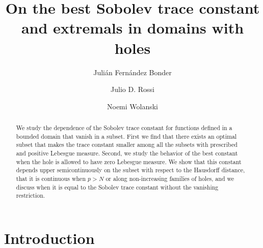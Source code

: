 \documentclass[11pt]{amsart}
\title[Sobolev trace constant in domains with holes]{On the best Sobolev trace constant and extremals in domains with holes}
\author[J. Fernández Bonder]{Julián Fernández Bonder}
\author[J. D. Rossi]{Julio D. Rossi}
\author[N. Wolanski]{Noemi Wolanski}
\theoremstyle{remark}
\numberwithin{equation}{section}
\begin{document}
\begin{abstract}
We study the dependence of the Sobolev trace constant for functions defined in a bounded domain that vanish in a subset. First we find that there exists an optimal subset that makes the trace constant smaller among all the subsets with prescribed and positive Lebesgue measure. Second, we study the behavior of the best constant when the hole is allowed to have zero Lebesgue measure. We show that this constant depends upper semicontinuously on the subset with respect to the Hausdorff distance, that it is continuous when $p>N$ or along non-increasing families of holes, and we discuss when it is equal to the Sobolev trace constant without the vanishing restriction.
\end{abstract}

\maketitle

\section{Introduction}
\end{document}
